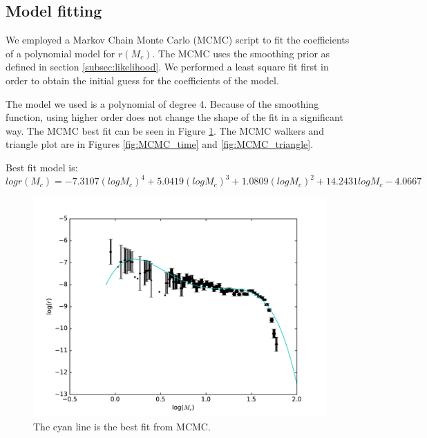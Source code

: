 \subsection{Model fitting}
\label{subsec:fitting}
We employed a Markov Chain Monte Carlo (MCMC) script to fit the coefficients of a polynomial model for $r(M_c)$. The MCMC uses the smoothing prior as defined in section \ref{subsec:likelihood}. We performed a least square fit first in order to obtain the initial guess for the coefficients of the model.

The model we used is a polynomial of degree 4. Because of the smoothing function, using higher order does not change the shape of the fit in a significant way. The MCMC best fit can be seen in Figure \ref{fig:line_MCMC}. The MCMC walkers and triangle plot are in Figures \ref{fig:MCMC_time} and \ref{fig:MCMC_triangle}.

Best fit model is:
\begin{equation}
\label{MCMC_best_fit}
logr(M_c) = -7.3107 (logM_c)^4 + 5.0419 (logM_c)^3 + 1.0809 (logM_c)^2 + 14.2431 logM_c - 4.0667
\end{equation}

\begin{figure}[ht]
  \includegraphics[width=\columnwidth]{img/line-MCMC.pdf}
  \caption{The cyan line is the best fit from MCMC.}
  \label{fig:line_MCMC}
\end{figure}


